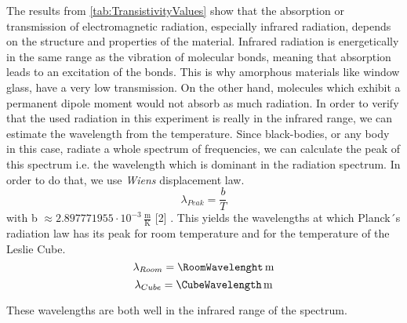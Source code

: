 \documentclass[a4paper,10pt,twocolumn]{article}
\begin{document}
    The results from \autoref{tab:TransistivityValues} show that the absorption or
    transmission of electromagnetic radiation, especially
    infrared radiation, depends on the structure and properties of the material. 
    Infrared radiation is energetically in the same range as the vibration of molecular
    bonds, meaning that absorption leads to an excitation of the bonds.
    This is why amorphous materials like window glass, have a very low transmission.
    On the other hand, molecules which exhibit a permanent dipole moment would not absorb as much radiation.
    In order to verify that the used radiation in this experiment is really in the infrared range, we can estimate the wavelength from the temperature.
    Since black-bodies, or any body in this case, radiate a whole spectrum of frequencies, we can calculate the peak of this spectrum i.e. the wavelength which is
    dominant in the radiation spectrum.
    In order to do that, we use \textit{Wiens} displacement law.
    \begin{equation}
        \lambda_{Peak} = \frac{b}{T}
    \end{equation}
    with b $\approx 2.897771955\cdot 10^{-3}\,\frac{\text{m}}{\text{K}}$ [2] .
    This yields the wavelengths at which Planck´s radiation law has its peak for room temperature and for the temperature of the Leslie Cube.
    \begin{equation}
        \lambda_{Room} = \RoomWavelenght \,\text{m}
    \end{equation}
    \begin{equation}
        \lambda_{Cube} = \CubeWavelength \,\text{m}
    \end{equation}
    
    These wavelengths are both well in the infrared range of the spectrum.
    
    
    
\end{document}
